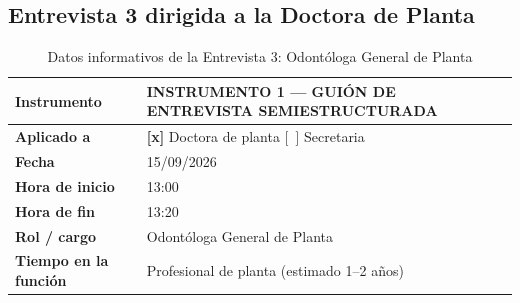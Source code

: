 \subsection*{Entrevista 3 dirigida a la Doctora de Planta}

\begin{table}[H]
\centering
\caption{Datos informativos de la Entrevista 3: Odontóloga General de Planta}
\label{tab:ent3_datos}
\fontsize{10}{12}\selectfont
\renewcommand{\arraystretch}{1.2}
\begin{tabularx}{\linewidth}{|>{\bfseries}p{3.8cm}|X|}
\hline
Instrumento & INSTRUMENTO 1 — GUIÓN DE ENTREVISTA SEMIESTRUCTURADA \\ \hline
Aplicado a  & \textbf{[x]} Doctora de planta \quad \mbox{[~]} Secretaria \\ \hline
Fecha       & 15/09/2026 \\ \hline
Hora de inicio & 13:00 \\ \hline
Hora de fin    & 13:20 \\ \hline
Rol / cargo & Odontóloga General de Planta \\ \hline
Tiempo en la función & Profesional de planta (estimado 1--2 años) \\ \hline
\end{tabularx}
\end{table}

